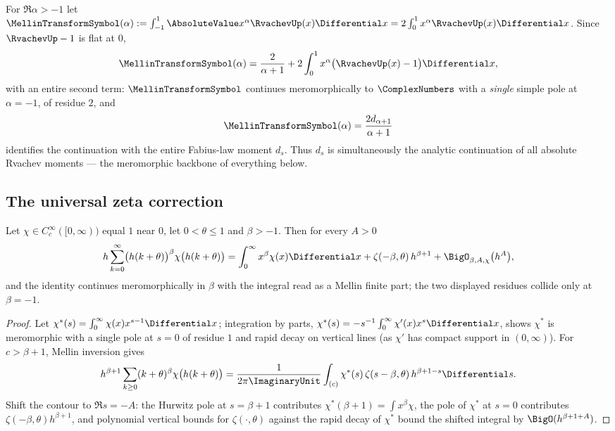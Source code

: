 For $\Re\alpha>-1$ let
$\MellinTransformSymbol(\alpha):=\int_{-1}^{1}\AbsoluteValue x^{\alpha}\RvachevUp(x)\Differential x
=2\int_0^1x^{\alpha}\RvachevUp(x)\Differential x$.  Since $\RvachevUp-1$ is flat at $0$,
\begin{equation}
 \MellinTransformSymbol(\alpha)
 =\frac{2}{\alpha+1}
 +2\int_0^1x^{\alpha}\bigl(\RvachevUp(x)-1\bigr)\Differential x,
 \label{eq:Mellin-continuation}
\end{equation}
with an entire second term: $\MellinTransformSymbol$ continues meromorphically to $\ComplexNumbers$
with a \emph{single} simple pole at $\alpha=-1$, of residue $2$, and
\begin{equation}
 \MellinTransformSymbol(\alpha)=\frac{2d_{\alpha+1}}{\alpha+1}
 \label{eq:Mellin-d}
\end{equation}
identifies the continuation with the entire Fabius-law moment
$d_s$.  Thus $d_s$ is simultaneously the analytic continuation of all
absolute Rvachev moments --- the meromorphic backbone of everything
below.

\subsection{The universal zeta correction}

\begin{lemma}
\label{lem:cutoff-mellin}
Let $\chi\in C_c^\infty([0,\infty))$ equal $1$ near $0$, let
$0<\theta\le1$ and $\beta>-1$.  Then for every $A>0$
\begin{equation}
 h\sum_{k=0}^{\infty}\bigl(h(k+\theta)\bigr)^{\beta}
 \chi\bigl(h(k+\theta)\bigr)
 =\int_0^{\infty}x^{\beta}\chi(x)\Differential x
 +\zeta(-\beta,\theta)\,h^{\beta+1}
 +\BigO_{\beta,A,\chi}\bigl(h^{A}\bigr),
 \label{eq:cutoff-mellin}
\end{equation}
and the identity continues meromorphically in $\beta$ with the
integral read as a Mellin finite part; the two displayed residues
collide only at $\beta=-1$.
\end{lemma}

\begin{proof}
Let $\chi^{*}(s)=\int_0^\infty\chi(x)x^{s-1}\Differential x$; integration by
parts, $\chi^{*}(s)=-s^{-1}\int_0^\infty\chi'(x)x^{s}\Differential x$, shows
$\chi^{*}$ is meromorphic with a single pole at $s=0$ of residue
$1$ and rapid decay on vertical lines (as $\chi'$ has compact support
in $(0,\infty)$).  For $c>\beta+1$, Mellin inversion gives
\[
 h^{\beta+1}\sum_{k\ge0}(k+\theta)^{\beta}
 \chi\bigl(h(k+\theta)\bigr)
 =\frac{1}{2\pi\ImaginaryUnit}\int_{(c)}
 \chi^{*}(s)\,\zeta(s-\beta,\theta)\,h^{\beta+1-s}\Differential s.
\]
Shift the contour to $\Re s=-A$: the Hurwitz pole at $s=\beta+1$
contributes $\chi^{*}(\beta+1)=\int x^{\beta}\chi$, the pole of
$\chi^{*}$ at $s=0$ contributes $\zeta(-\beta,\theta)h^{\beta+1}$,
and polynomial vertical bounds for $\zeta(\cdot,\theta)$ against the
rapid decay of $\chi^{*}$ bound the shifted integral by
$\BigO(h^{\beta+1+A})$.
\end{proof}

